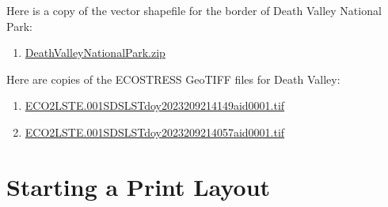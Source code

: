 \documentclass[oneside,a4paper,11pt,explicit]{book}
\begin{document}
\begin{tcolorbox}[colback=yellow!5!white,title=\textbf{Datafiles}]
	\large
        Here is a copy of the vector shapefile for the border of Death Valley National Park:
        \begin{enumerate}
            \item \href{https://jeremydforsythe.github.io/icecream-tutorials/Tutorial4_AccessingRemoteSensingDataWithAppears/DeathValleyNationalPark.zip}{DeathValleyNationalPark.zip}
        \end{enumerate}
	Here are copies of the ECOSTRESS GeoTIFF files for Death Valley:
	\begin{enumerate}
		\item \href{https://jeremydforsythe.github.io/icecream-tutorials/Tutorial5_AccessingRemoteSensingDataWithAppears/ECO2LSTE.001_SDS_LST_doy2023209214149_aid0001.tif}{\small ECO2LSTE.001\textunderscore SDS\textunderscore LST\textunderscore doy2023209214149\textunderscore aid0001.tif}
		\item \href{https://jeremydforsythe.github.io/icecream-tutorials/Tutorial5_AccessingRemoteSensingDataWithAppears/ECO2LSTE.001_SDS_LST_doy2023209214057_aid0001.tif}{\small ECO2LSTE.001\textunderscore SDS\textunderscore LST\textunderscore doy2023209214057\textunderscore aid0001.tif}
	\end{enumerate}
\end{tcolorbox}

\section{Starting a Print Layout}
\end{document}
